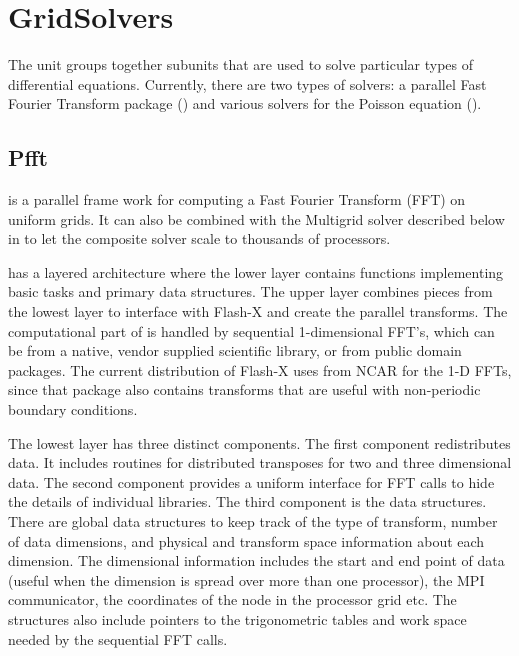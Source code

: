 \section{GridSolvers}
\label{Sec:Solvers}


The  unit groups together subunits that are used
to solve particular types of differential equations.  Currently, there
are two types of solvers:  a parallel Fast Fourier Transform package ()
and various solvers for the Poisson equation ().


\subsection {Pfft}
\label{Sec:GridSolversPfft}
 is a parallel frame work for computing a Fast Fourier
Transform (FFT) on uniform grids. It can also be combined with the
Multigrid solver described below in  
to let the composite solver scale to thousands of processors. 

 has a layered architecture where the lower layer contains
functions implementing basic tasks and primary data structures.  The
upper layer combines pieces from the lowest layer to interface with Flash-X 
and create the parallel transforms. The computational part
of  is handled by sequential 1-dimensional FFT's, which can be
from a native, vendor supplied scientific library, or from public
domain packages. The current distribution of Flash-X uses  from
NCAR for the 1-D FFTs, since that package also contains transforms
that are useful with non-periodic boundary conditions. 

The lowest layer has three distinct components.  
The first component  redistributes data. 
It includes routines for distributed transposes
for two and three dimensional data. The second component provides a
uniform interface for FFT calls to hide the details of individual
libraries.  The third component is the data structures. There are global
data structures to keep track of the type of transform, number of data
dimensions, and physical and transform space information about each
dimension. The dimensional information 
includes the start and end point of data 
(useful when the dimension is spread over more than one processor), 
the MPI communicator, the coordinates of the node in
the processor grid etc. The structures also include pointers to the trigonometric
tables and work space needed by the sequential FFT calls. 

